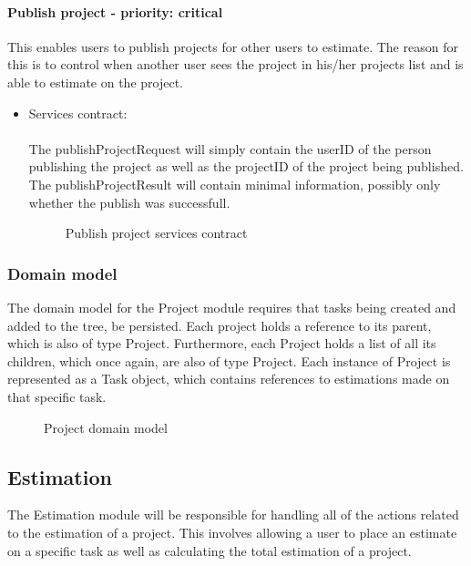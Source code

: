 \paragraph{Publish project - priority: critical}
This enables users to publish projects for other users to estimate. The reason for this is to control when another user sees the project in his/her projects list and is able to estimate on the project.

\begin{itemize}
	\item Services contract:\\ \\
	The publishProjectRequest will simply contain the userID of the person publishing the project as well as the projectID of the project being published. The publishProjectResult will contain minimal information, possibly only whether the publish was successfull.
	\begin{figure}[H]
    	\centering
    	\caption{Publish project services contract}
    	\label{fig:publishProject}
   	\end{figure}
\end{itemize}

\subsubsection{Domain model}
The domain model for the Project module requires that tasks being created and added to the tree, be persisted. Each project holds a reference to its parent, which is also of type Project. Furthermore, each Project holds a list of all its children, which once again, are also of type Project. Each instance of Project is represented as a Task object, which contains references to estimations made on that specific task.
\begin{figure}[H]
	\centering
	\caption{Project domain model}
	\label{fig:Project_domain_model}
\end{figure}

\subsection{Estimation}
	The Estimation module will be responsible for handling all of the actions related to the estimation of a project. This involves allowing a user to place an estimate on a specific task as well as calculating the total estimation of a project.
